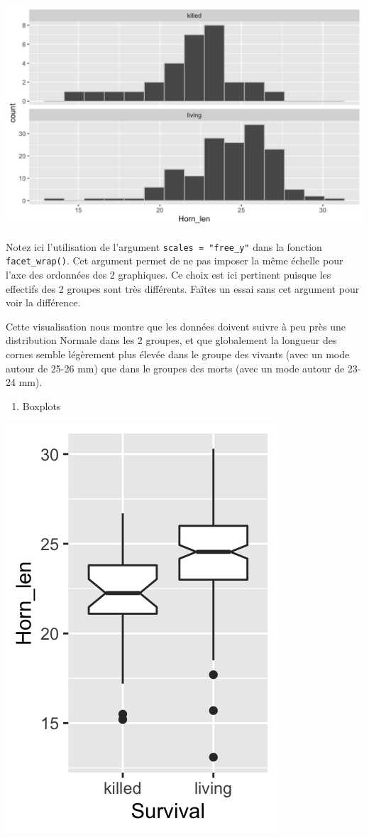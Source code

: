 \documentclass[a4paperpaper,]{article}
\newenvironment{Shaded}{\begin{snugshade}}{\end{snugshade}}
\newcommand{\DataTypeTok}[1]{\textcolor[rgb]{0.00,0.34,0.68}{#1}}
\newcommand{\KeywordTok}[1]{\textcolor[rgb]{0.12,0.11,0.11}{\textbf{#1}}}
\newcommand{\NormalTok}[1]{\textcolor[rgb]{0.12,0.11,0.11}{#1}}
\newcommand{\OperatorTok}[1]{\textcolor[rgb]{0.12,0.11,0.11}{#1}}
\newcommand{\OtherTok}[1]{\textcolor[rgb]{0.00,0.43,0.16}{#1}}
\newcommand{\StringTok}[1]{\textcolor[rgb]{0.75,0.01,0.01}{#1}}
\providecommand{\tightlist}{%
  \setlength{\itemsep}{0pt}\setlength{\parskip}{0pt}}
\begin{document}
\begin{center}\includegraphics[width=0.9\linewidth]{figure/unnamed-chunk-50-1} \end{center}

Notez ici l'utilisation de l'argument \texttt{scales\ =\ "free\_y"} dans la fonction \texttt{facet\_wrap()}. Cet argument permet de ne pas imposer la même échelle pour l'axe des ordonnées des 2 graphiques. Ce choix est ici pertinent puisque les effectifs des 2 groupes sont très différents. Faîtes un essai sans cet argument pour voir la différence.

Cette visualisation nous montre que les données doivent suivre à peu près une distribution Normale dans les 2 groupes, et que globalement la longueur des cornes semble légèrement plus élevée dans le groupe des vivants (avec un mode autour de 25-26 mm) que dans le groupes des morts (avec un mode autour de 23-24 mm).

\begin{enumerate}
\def\labelenumi{\arabic{enumi}.}
\setcounter{enumi}{2}
\tightlist
\item
  Boxplots
\end{enumerate}

\begin{Shaded}
\end{Shaded}

\begin{center}\includegraphics[width=0.25\linewidth]{figure/unnamed-chunk-51-1} \end{center}
\end{document}
